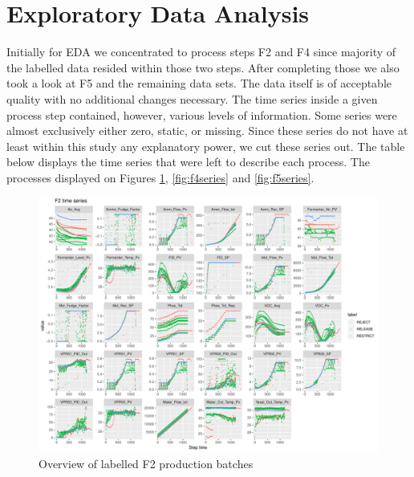 \documentclass{article}
\begin{document}
\section{Exploratory Data Analysis}
Initially for EDA we concentrated to process steps F2 and F4 since majority of the labelled data resided within those two steps. After completing those we also took a look at F5 and the remaining data sets. The data itself is of acceptable quality with no additional changes necessary. The time series inside a given process step contained, however, various levels of information. Some series were almost exclusively either zero, static, or missing. Since these series do not have at least within this study any explanatory power, we cut these series out. The table below displays the time series that were left to describe each process. The processes displayed on Figures \ref{fig:f2series}, \ref{fig:f4series} and \ref{fig:f5series}.

\begin{figure}[ht]
    \centering
    \includegraphics[width=1.0\textwidth]{f2_plot}
    \caption{Overview of labelled F2 production batches}
    \label{fig:f2series}
\end{figure}
\end{document}
